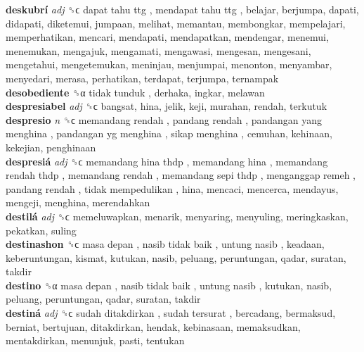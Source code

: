 \textbf{deskubrí} \emph{adj}  ␝ϲ   dapat tahu ttg ,  mendapat tahu ttg , belajar, berjumpa, dapati, didapati, diketemui, jumpaan, melihat, memantau, membongkar, mempelajari, memperhatikan, mencari, mendapati, mendapatkan, mendengar, menemui, menemukan, mengajuk, mengamati, mengawasi, mengesan, mengesani, mengetahui, mengetemukan, meninjau, menjumpai, menonton, menyambar, menyedari, merasa, perhatikan, terdapat, terjumpa, ternampak  \\
\textbf{desobediente} ␝α   tidak tunduk , derhaka, ingkar, melawan  \\
\textbf{despresiabel} \emph{adj}  ␝ϲ  bangsat, hina, jelik, keji, murahan, rendah, terkutuk  \\
\textbf{despresio} \emph{n}  ␝ϲ   memandang rendah ,  pandang rendah ,  pandangan yang menghina ,  pandangan yg menghina ,  sikap menghina , cemuhan, kehinaan, kekejian, penghinaan  \\
\textbf{despresiá} \emph{adj}  ␝ϲ   memandang hina thdp ,  memandang hina ,  memandang rendah thdp ,  memandang rendah ,  memandang sepi thdp ,  menganggap remeh ,  pandang rendah ,  tidak mempedulikan , hina, mencaci, mencerca, mendayus, mengeji, menghina, merendahkan  \\
\textbf{destilá} \emph{adj}  ␝ϲ  memeluwapkan, menarik, menyaring, menyuling, meringkaskan, pekatkan, suling  \\
\textbf{destinashon} ␝ϲ   masa depan ,  nasib tidak baik ,  untung nasib , keadaan, keberuntungan, kismat, kutukan, nasib, peluang, peruntungan, qadar, suratan, takdir  \\
\textbf{destino} ␝α   masa depan ,  nasib tidak baik ,  untung nasib , kutukan, nasib, peluang, peruntungan, qadar, suratan, takdir  \\
\textbf{destiná} \emph{adj}  ␝ϲ   sudah ditakdirkan ,  sudah tersurat , bercadang, bermaksud, berniat, bertujuan, ditakdirkan, hendak, kebinasaan, memaksudkan, mentakdirkan, menunjuk, pasti, tentukan  \\
